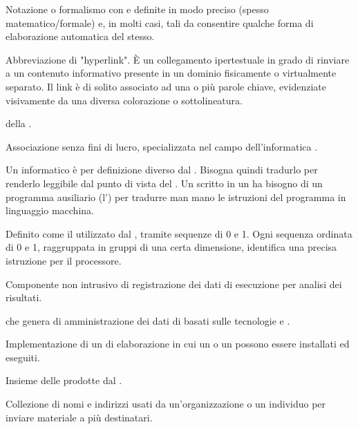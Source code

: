 {Notazione o formalismo con  e  definite in modo preciso (spesso matematico/formale) e, in molti casi, tali da consentire qualche forma di elaborazione automatica del  stesso.}

{Abbreviazione di "hyperlink". \`{E} un collegamento ipertestuale in grado di rinviare a un contenuto informativo presente in un dominio fisicamente o virtualmente separato. Il link è di solito associato ad una o più parole chiave, evidenziate visivamente da una diversa colorazione o sottolineatura.}

{ della .}

{Associazione senza fini di lucro, specializzata nel campo dell'informatica .}

{Un  informatico è per definizione diverso dal . Bisogna quindi tradurlo per renderlo leggibile dal punto di vista del . Un  scritto in un  ha bisogno di un programma ausiliario (l') per tradurre man mano le istruzioni del programma in linguaggio macchina.}

{Definito come il  utilizzato dal , tramite sequenze di 0 e 1. Ogni sequenza ordinata di 0 e 1, raggruppata in gruppi di una certa dimensione, identifica una precisa istruzione per il processore.}

{Componente non intrusivo di registrazione dei dati di esecuzione per analisi dei risultati.}




{ che genera   di amministrazione dei dati di  basati sulle tecnologie e .}

{Implementazione  di un  di elaborazione in cui un  o un  possono essere installati ed eseguiti.}

{Insieme delle  prodotte dal  .}

{Collezione di nomi e indirizzi usati da un'organizzazione o un individuo per inviare materiale a più destinatari.  }

